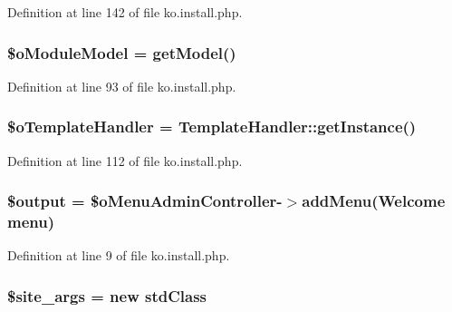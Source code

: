 Definition at line 142 of file ko.\+install.\+php.

\hypertarget{ko_8install_8php_a8d7a87df524e7d6938f66f8e284cdd1e}{}
\subsubsection[{\$o\+Module\+Model}]{\setlength{\rightskip}{0pt plus 5cm}\$o\+Module\+Model = {\bf get\+Model}(\textquotesingle{})}\label{ko_8install_8php_a8d7a87df524e7d6938f66f8e284cdd1e}


Definition at line 93 of file ko.\+install.\+php.

\hypertarget{ko_8install_8php_abd57e3ab220291ea9b5c16c2a4e0670e}{}
\subsubsection[{\$o\+Template\+Handler}]{\setlength{\rightskip}{0pt plus 5cm}\$o\+Template\+Handler = {\bf Template\+Handler\+::get\+Instance}()}\label{ko_8install_8php_abd57e3ab220291ea9b5c16c2a4e0670e}


Definition at line 112 of file ko.\+install.\+php.

\hypertarget{ko_8install_8php_a73004ce9cd673c1bfafd1dc351134797}{}
\subsubsection[{\$output}]{\setlength{\rightskip}{0pt plus 5cm}\$output = \$o\+Menu\+Admin\+Controller-\/$>$add\+Menu(\textquotesingle{}Welcome {\bf menu}\textquotesingle{})}\label{ko_8install_8php_a73004ce9cd673c1bfafd1dc351134797}


Definition at line 9 of file ko.\+install.\+php.

\hypertarget{ko_8install_8php_a19e0fcfacd69155c9cc255e5500f6ccc}{}
\subsubsection[{\$site\+\_\+args}]{\setlength{\rightskip}{0pt plus 5cm}\$site\+\_\+args = new std\+Class}\label{ko_8install_8php_a19e0fcfacd69155c9cc255e5500f6ccc}


